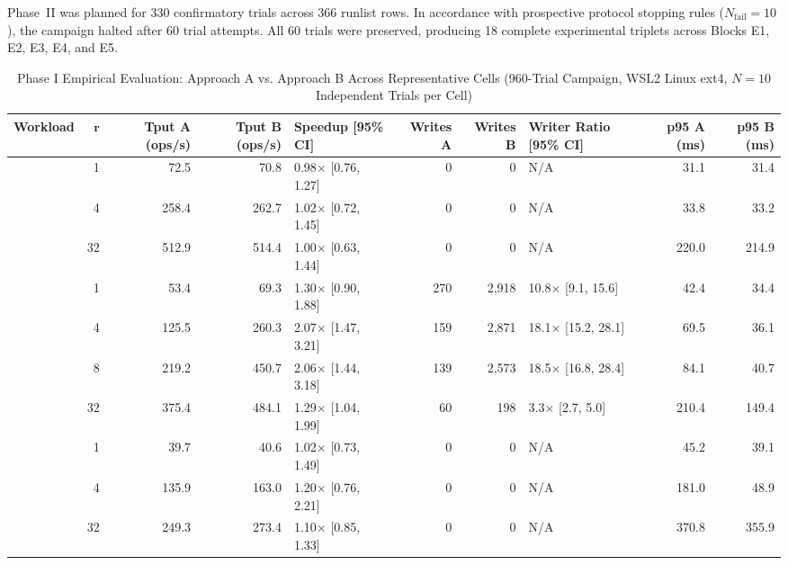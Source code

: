 \documentclass[conference]{IEEEtran}
\begin{document}
Phase~II was planned for 330 confirmatory trials across 366 runlist rows. In accordance with prospective protocol stopping rules ($N_{\text{fail}} = 10$), the campaign halted after 60 trial attempts. All 60 trials were preserved, producing 18 complete experimental triplets across Blocks E1, E2, E3, E4, and E5.

\begin{table}[t]
\caption{Phase I Empirical Evaluation: Approach A vs. Approach B Across Representative Cells (960-Trial Campaign, WSL2 Linux ext4, $N=10$ Independent Trials per Cell)}
\label{tab:phase1_results}
\centering
\footnotesize
\setlength{\tabcolsep}{3.5pt}
\begin{tabular}{@{}l r r r l r r l r r@{}}
\toprule
\textbf{Workload} & $\mathbf{r}$ & \textbf{Tput A (ops/s)} & \textbf{Tput B (ops/s)} & \textbf{Speedup [95\% CI]} & \textbf{Writes A} & \textbf{Writes B} & \textbf{Writer Ratio [95\% CI]} & \textbf{p95 A (ms)} & \textbf{p95 B (ms)} \\
\midrule
{}
& 1  & 72.5  & 70.8  & 0.98$\times$ [0.76, 1.27] & 0 & 0 & N/A & 31.1 & 31.4 \\
& 4  & 258.4 & 262.7 & 1.02$\times$ [0.72, 1.45] & 0 & 0 & N/A & 33.8 & 33.2 \\
& 32 & 512.9 & 514.4 & 1.00$\times$ [0.63, 1.44] & 0 & 0 & N/A & 220.0 & 214.9 \\
\midrule
{}
& 1  & 53.4  & 69.3  & 1.30$\times$ [0.90, 1.88] & 270 & 2,918 & 10.8$\times$ [9.1, 15.6] & 42.4 & 34.4 \\
& 4  & 125.5 & 260.3 & 2.07$\times$ [1.47, 3.21] & 159 & 2,871 & 18.1$\times$ [15.2, 28.1] & 69.5 & 36.1 \\
& 8  & 219.2 & 450.7 & 2.06$\times$ [1.44, 3.18] & 139 & 2,573 & 18.5$\times$ [16.8, 28.4] & 84.1 & 40.7 \\
& 32 & 375.4 & 484.1 & 1.29$\times$ [1.04, 1.99] & 60  & 198   & 3.3$\times$ [2.7, 5.0]   & 210.4 & 149.4 \\
\midrule
{}
& 1  & 39.7  & 40.6  & 1.02$\times$ [0.73, 1.49] & 0 & 0 & N/A & 45.2 & 39.1 \\
& 4  & 135.9 & 163.0 & 1.20$\times$ [0.76, 2.21] & 0 & 0 & N/A & 181.0 & 48.9 \\
& 32 & 249.3 & 273.4 & 1.10$\times$ [0.85, 1.33] & 0 & 0 & N/A & 370.8 & 355.9 \\

\end{tabular}
\end{table}
\end{document}
